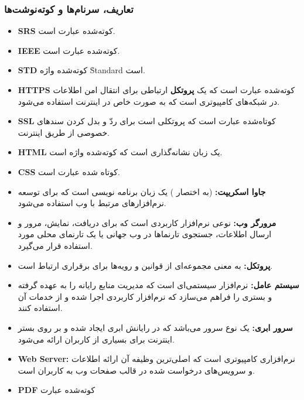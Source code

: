 \documentclass[12pt]{article}
\begin{document}
	\subsubsection{تعاریف، سرنام‌ها و کوته‌نوشت‌ها}
		\begin{itemize}
		\item
		\textbf{SRS}
		کوته‌شده عبارت
	 	  است.
		\item
		\textbf{IEEE}
		کوته‌شده عبارت
		  است.
		\item
		\textbf{STD}
		 کوته‌شده واژه
		 \r{Standard}
		  است.
		\item
		\textbf{HTTPS}
		 کوته‌شده عبارت
		است که یک \textbf{پروتکل} ارتباطی برای انتقال امن اطلاعات در شبکه‌های کامپیوتری است که به صورت خاص در اینترنت استفاده می‌شود.
		\item
		\textbf{SSL}
		کوتاه‌شده عبارت
		 است که پروتکلی است برای ردّ و بدل کردن سندهای خصوصی از طریق اینترنت.
		\item
		\textbf{HTML}
		یک زبان نشانه‌گذاری است که کوته‌شده واژه
		است.
		\item
		\textbf{CSS}
		کوتاه شده عبارت
		 است.
		\item
		\textbf{جاوا اسکریپت:}
		 (به اختصار )
		 یک زبان برنامه نویسی است که برای توسعه نرم‌افزارهای مرتبط با وب استفاده می‌شود.
		\item
		\textbf{مرورگر وب:}
		 نوعی نرم‌افزار کاربردی است که برای دریافت، نمایش، مرور و ارسال اطلاعات، جستجوی تارنماها در وب جهانی یا یک تارنمای محلی مورد استفاده قرار می‌گیرد.
		\item
		\textbf{پروتکل:}
		 به معنی مجموعه‌ای از قوانین و رویه‌ها برای برقراری ارتباط است.
		\item
		\textbf{سیستم عامل:}
		 نرم‌افزار سیستمی‌ای است که مدیریت منابع رایانه را به عهده گرفته و بستری را فراهم می‌سازد که نرم‌افزار کاربردی اجرا شده و از خدمات آن استفاده کنند.
		\item
		\textbf{سرور ابری:}
		یک نوع سرور می‌باشد که در رایانش ابری ایجاد شده و بر روی بستر اینترنت برای بسیاری از کاربران ارائه می‌شود.
		\item
		\textbf{Web Server:}
		نرم‌افزاری کامپیوتری است که اصلی‌ترین وظیفه آن ارائه اطلاعات و سرویس‌های درخواست شده در قالب صفحات وب به کاربران است.
		\item
		\textbf{PDF}
		 کوته‌شده عبارت

\end{itemize}
\end{document}
